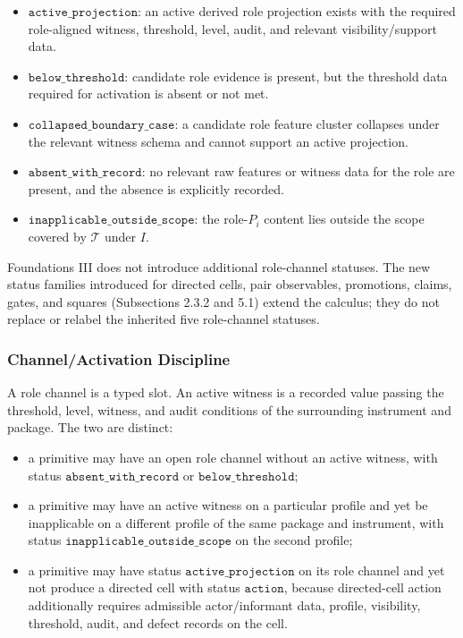 \documentclass[11pt]{article}
\providecommand{\tightlist}{}
\theoremstyle{definition}
\begin{document}
\begin{itemize}
\tightlist
\item
  \(\texttt{active\_projection}\): an active derived role projection exists with the required role-aligned witness, threshold, level, audit, and relevant visibility/support data.
\item
  \(\texttt{below\_threshold}\): candidate role evidence is present, but the threshold data required for activation is absent or not met.
\item
  \(\texttt{collapsed\_boundary\_case}\): a candidate role feature cluster collapses under the relevant witness schema and cannot support an active projection.
\item
  \(\texttt{absent\_with\_record}\): no relevant raw features or witness data for the role are present, and the absence is explicitly recorded.
\item
  \(\texttt{inapplicable\_outside\_scope}\): the role-\(P_i\) content lies outside the scope covered by \(\mathcal T\) under \(I\).
\end{itemize}

Foundations III does not introduce additional role-channel statuses. The new status families introduced for directed cells, pair observables, promotions, claims, gates, and squares (Subsections 2.3.2 and 5.1) extend the calculus; they do not replace or relabel the inherited five role-channel statuses.

\subsubsection{Channel/Activation Discipline}

A role channel is a typed slot. An active witness is a recorded value passing the threshold, level, witness, and audit conditions of the surrounding instrument and package. The two are distinct:

\begin{itemize}
\tightlist
\item
  a primitive may have an open role channel without an active witness, with status \(\texttt{absent\_with\_record}\) or \(\texttt{below\_threshold}\);
\item
  a primitive may have an active witness on a particular profile and yet be inapplicable on a different profile of the same package and instrument, with status \(\texttt{inapplicable\_outside\_scope}\) on the second profile;
\item
  a primitive may have status \(\texttt{active\_projection}\) on its role channel and yet not produce a directed cell with status \(\texttt{action}\), because directed-cell action additionally requires admissible actor/informant data, profile, visibility, threshold, audit, and defect records on the cell.
\end{itemize}
\end{document}
